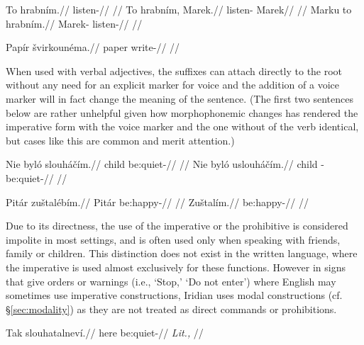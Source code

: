 \pex
\begingl
    \gla To hrabn\'im.//
    \glb {} listen-//
    \glft {}//
\endgl
\xe
\pex
\a
\begingl
    \gla To hrabn\'im, Marek.//
    \glb {} listen- Marek//
    \glft {}//
\endgl
\a
\begingl
    \gla Marku to hrabn\'im.//
    \glb Marek-  listen-//
    \glft {}//
\endgl
\xe

\pex
\begingl
    \gla Pap\'ir \v{s}virkoun\'ema.//
    \glb paper write-//
    \glft {}//
\endgl
\xe

When used with verbal adjectives, the suffixes can attach directly to the root without any need for an explicit marker for voice and the addition of a voice marker will in fact change the meaning of the sentence. (The first two sentences below are rather unhelpful given how morphophonemic changes has rendered the imperative form with the voice marker and the one without of the verb  identical, but cases like this are common and merit attention.)

\pex
\a
\begingl
    \gla Nie byl\'o slouh\'a\v{c}\'im.//
    \glb {} child be:quiet-//
    \glft {}//
\endgl
\a
\begingl
    \gla Nie byl\'o uslouh\'a\v{c}\'im.//
    \glb {} child -be:quiet-//
    \glft {}//
\endgl
\xe

\pex
\a
\begingl
    \gla Pit\'ar zu\v{s}tal\'eb\'im.//
    \glb Pit\'ar be:happy-//
    \glft {}//
\endgl
\a
\begingl
    \gla Zu\v{s}tal\'im.//
    \glb be:happy-//
    \glft {}//
\endgl
\xe


Due to its directness, the use of the imperative or the prohibitive is
considered impolite in most settings, and is often used only when speaking with
friends, family or children. This distinction does not exist in the written
language, where the imperative is used almost exclusively for these functions.
However in signs that give orders or warnings (i.e., `Stop,' `Do not enter')
where English may sometimes use imperative constructions, Iridian uses modal
constructions (cf. \S\ref{sec:modality}) as they are not treated
 as direct commands or prohibitions.

\pex
\begingl
    \gla Tak slouhatalnev\'i.//
    \glb here be:quiet-//
    \glft {} \textit{Lit.,} //
\endgl
\xe

